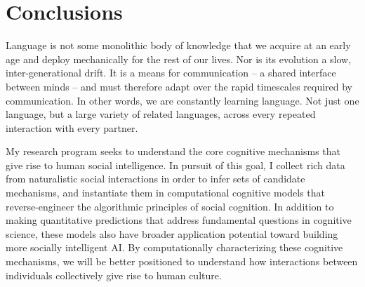 \documentclass[11pt]{article}
\begin{document}

\section*{Conclusions}


Language is not some monolithic body of knowledge that we acquire at an early age and deploy mechanically for the rest of our lives. Nor is its evolution a slow, inter-generational drift. It is a means for communication -- a shared interface between minds -- and must therefore adapt over the rapid timescales required by communication. In other words, we are constantly learning language. Not just one language, but a large variety of related languages, across every repeated interaction with every partner. 

My research program seeks to understand the core cognitive mechanisms that give rise to human social intelligence.
In pursuit of this goal, I collect rich data from naturalistic social interactions in order to infer sets of candidate mechanisms, and instantiate them in computational cognitive models that reverse-engineer the algorithmic principles of social cognition. 
In addition to making quantitative predictions that address fundamental questions in cognitive science, these models also have broader application potential toward building more socially intelligent AI.
By computationally characterizing these cognitive mechanisms, we will be better positioned to understand how interactions between individuals collectively give rise to human culture. 




\small
\singlespacing


\end{document}
